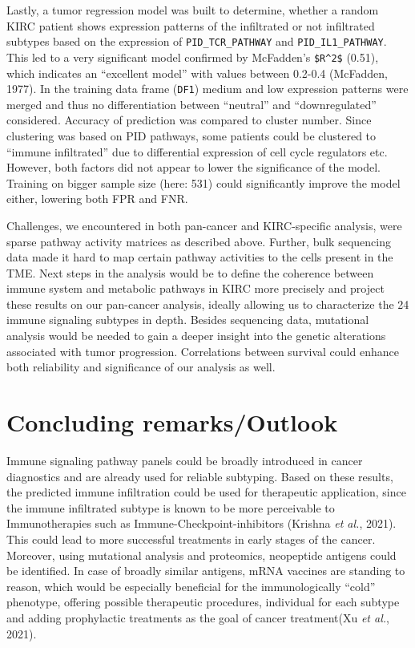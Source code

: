 \documentclass[
  parskip,
  oneside]{scrreprt}
\begin{document}
Lastly, a tumor regression model was built to determine, whether a
random KIRC patient shows expression patterns of the infiltrated or not
infiltrated subtypes based on the expression of
\texttt{PID\_TCR\_PATHWAY} and \texttt{PID\_IL1\_PATHWAY}. This led to a
very significant model confirmed by McFadden's \texttt{\$R\^{}2\$}
(0.51), which indicates an ``excellent model'' with values between
0.2-0.4 (McFadden, 1977). In the training data frame (\texttt{DF1})
medium and low expression patterns were merged and thus no
differentiation between ``neutral'' and ``downregulated'' considered.
Accuracy of prediction was compared to cluster number. Since clustering
was based on PID pathways, some patients could be clustered to ``immune
infiltrated'' due to differential expression of cell cycle regulators
etc. However, both factors did not appear to lower the significance of
the model. Training on bigger sample size (here: 531) could
significantly improve the model either, lowering both FPR and FNR.

Challenges, we encountered in both pan-cancer and KIRC-specific
analysis, were sparse pathway activity matrices as described above.
Further, bulk sequencing data made it hard to map certain pathway
activities to the cells present in the TME. Next steps in the analysis
would be to define the coherence between immune system and metabolic
pathways in KIRC more precisely and project these results on our
pan-cancer analysis, ideally allowing us to characterize the 24 immune
signaling subtypes in depth. Besides sequencing data, mutational
analysis would be needed to gain a deeper insight into the genetic
alterations associated with tumor progression. Correlations between
survival could enhance both reliability and significance of our analysis
as well.

\hypertarget{concluding-remarksoutlook}{%
\chapter{Concluding remarks/Outlook}\label{concluding-remarksoutlook}}

Immune signaling pathway panels could be broadly introduced in cancer
diagnostics and are already used for reliable subtyping. Based on these
results, the predicted immune infiltration could be used for therapeutic
application, since the immune infiltrated subtype is known to be more
perceivable to Immunotherapies such as Immune-Checkpoint-inhibitors
(Krishna \emph{et al.}, 2021). This could lead to more successful
treatments in early stages of the cancer. Moreover, using mutational
analysis and proteomics, neopeptide antigens could be identified. In
case of broadly similar antigens, mRNA vaccines are standing to reason,
which would be especially beneficial for the immunologically ``cold''
phenotype, offering possible therapeutic procedures, individual for each
subtype and adding prophylactic treatments as the goal of cancer
treatment(Xu \emph{et al.}, 2021).
\end{document}
